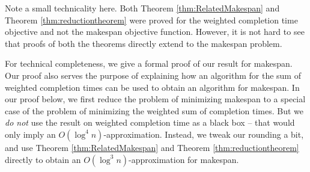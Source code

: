   Note a small technicality here. 
  Both Theorem \ref{thm:RelatedMakespan}  and Theorem \ref{thm:reductiontheorem} were proved for the weighted completion time objective and not the makespan objective function.
  However, it is not hard to see that proofs of both the theorems directly extend to the makespan problem.
  
  \medskip
  For technical completeness, we give a formal proof of our result for makespan.
  Our proof also serves the purpose of explaining how an algorithm for the sum of weighted completion times can be used to obtain an algorithm for makespan.
  In our proof below, we first reduce the problem of minimizing makespan to a special case of the problem of minimizing the weighted sum of completion times.
  But we {\em do not} use the result on weighted completion time as a black box -- that would only imply an $O(\log^4 n)$-approximation.
  Instead, we tweak our rounding a bit, and use Theorem \ref{thm:RelatedMakespan}  and Theorem \ref{thm:reductiontheorem} directly to obtain an $O(\log^3 n)$-approximation for makespan.
  
